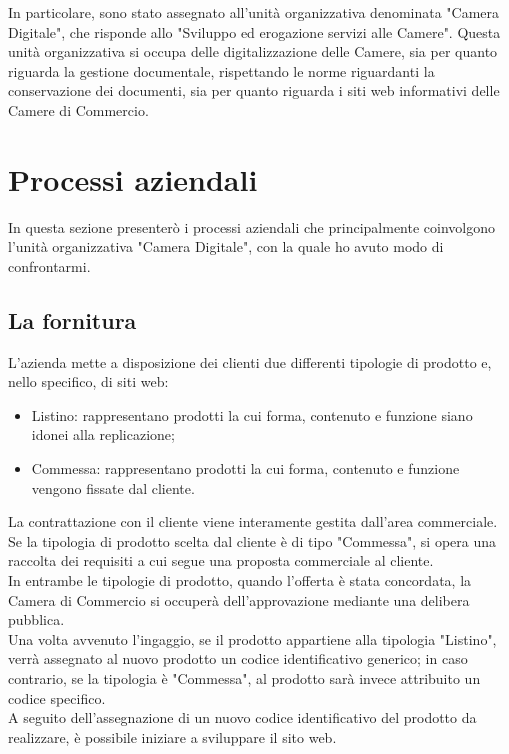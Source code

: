 	In particolare, sono stato assegnato all'unità organizzativa denominata "Camera Digitale", che risponde allo "Sviluppo ed erogazione servizi alle Camere". Questa unità organizzativa si occupa delle digitalizzazione delle Camere, sia per quanto riguarda la gestione documentale, rispettando le norme riguardanti la conservazione dei documenti, sia per quanto riguarda i siti web informativi delle Camere di Commercio.

\section{Processi aziendali}
\label{sec:processi_aziendali}
In questa sezione presenterò i processi aziendali che principalmente coinvolgono l'unità organizzativa "Camera Digitale", con la quale ho avuto modo di confrontarmi.

	\subsection{La fornitura}
	L'azienda mette a disposizione dei clienti due differenti tipologie di prodotto e, nello specifico, di siti web:
	\begin{itemize}
		\item{Listino: rappresentano prodotti la cui forma, contenuto e funzione siano idonei alla replicazione;}
		\item{Commessa: rappresentano prodotti la cui forma, contenuto e funzione vengono fissate dal cliente.}
	\end{itemize}
	La contrattazione con il cliente viene interamente gestita dall'area commerciale. \\
	Se la tipologia di prodotto scelta dal cliente è di tipo "Commessa", si opera una raccolta dei requisiti a cui segue una proposta commerciale al cliente. \\
	In entrambe le tipologie di prodotto, quando l'offerta è stata concordata, la Camera di Commercio si occuperà dell'approvazione mediante una delibera pubblica. \\
	Una volta avvenuto l'ingaggio, se il prodotto appartiene alla tipologia "Listino", verrà assegnato al nuovo prodotto un codice identificativo generico; in caso contrario, se la tipologia è "Commessa", al prodotto sarà invece attribuito un codice specifico. \\
	A seguito dell'assegnazione di un nuovo codice identificativo del prodotto da realizzare, è possibile iniziare a sviluppare il sito web.
	
